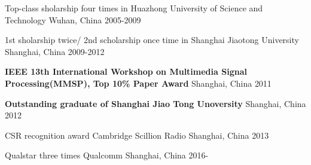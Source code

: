 



\begin{cvhonors}

  \cvhonor
    {} %
    {Top-class sholarship four times in Huazhong University of Science and Technology} %
    {Wuhan, China} %
    {2005-2009} %

  \cvhonor
    {} %
    {1st sholarship twice/ 2nd scholarship once time in Shanghai Jiaotong University} %
    {Shanghai, China} %
    {2009-2012} %

  \cvhonor
    {} %
    {\textbf{IEEE 13th International Workshop on Multimedia Signal Processing(MMSP), Top 10\% Paper Award}} %
    {Shanghai, China} %
    {2011} %

  \cvhonor
    {} %
    {\textbf{Outstanding graduate of Shanghai Jiao Tong Unoversity}} %
    {Shanghai, China} %
    {2012} %

\end{cvhonors}




\begin{cvhonors}

  \cvhonor
    {CSR recognition award} %
    {Cambridge Scillion Radio} %
    {Shanghai, China} %
    {2013} %

  \cvhonor
    {Qualstar three times} %
    {Qualcomm} %
    {Shanghai, China} %
    {2016-} %

\end{cvhonors}

